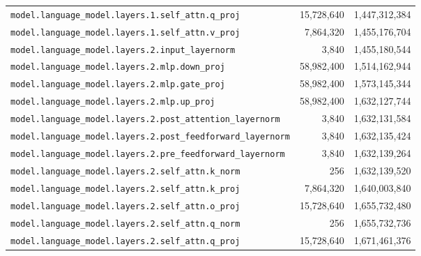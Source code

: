 \documentclass[10pt,a4paper]{article}
\theoremstyle{definition}
\begin{document}
\begin{appendices}
\begin{longtable}{p{9.5cm}rr}
\texttt{model.\allowbreak{}language\_model.\allowbreak{}layers.\allowbreak{}1.\allowbreak{}self\_attn.\allowbreak{}q\_proj} & 15,728,640 & 1,447,312,384 \\
\texttt{model.\allowbreak{}language\_model.\allowbreak{}layers.\allowbreak{}1.\allowbreak{}self\_attn.\allowbreak{}v\_proj} & 7,864,320 & 1,455,176,704 \\
\texttt{model.\allowbreak{}language\_model.\allowbreak{}layers.\allowbreak{}2.\allowbreak{}input\_layernorm} & 3,840 & 1,455,180,544 \\
\texttt{model.\allowbreak{}language\_model.\allowbreak{}layers.\allowbreak{}2.\allowbreak{}mlp.\allowbreak{}down\_proj} & 58,982,400 & 1,514,162,944 \\
\texttt{model.\allowbreak{}language\_model.\allowbreak{}layers.\allowbreak{}2.\allowbreak{}mlp.\allowbreak{}gate\_proj} & 58,982,400 & 1,573,145,344 \\
\texttt{model.\allowbreak{}language\_model.\allowbreak{}layers.\allowbreak{}2.\allowbreak{}mlp.\allowbreak{}up\_proj} & 58,982,400 & 1,632,127,744 \\
\texttt{model.\allowbreak{}language\_model.\allowbreak{}layers.\allowbreak{}2.\allowbreak{}post\_attention\_layernorm} & 3,840 & 1,632,131,584 \\
\texttt{model.\allowbreak{}language\_model.\allowbreak{}layers.\allowbreak{}2.\allowbreak{}post\_feedforward\_layernorm} & 3,840 & 1,632,135,424 \\
\texttt{model.\allowbreak{}language\_model.\allowbreak{}layers.\allowbreak{}2.\allowbreak{}pre\_feedforward\_layernorm} & 3,840 & 1,632,139,264 \\
\texttt{model.\allowbreak{}language\_model.\allowbreak{}layers.\allowbreak{}2.\allowbreak{}self\_attn.\allowbreak{}k\_norm} & 256 & 1,632,139,520 \\
\texttt{model.\allowbreak{}language\_model.\allowbreak{}layers.\allowbreak{}2.\allowbreak{}self\_attn.\allowbreak{}k\_proj} & 7,864,320 & 1,640,003,840 \\
\texttt{model.\allowbreak{}language\_model.\allowbreak{}layers.\allowbreak{}2.\allowbreak{}self\_attn.\allowbreak{}o\_proj} & 15,728,640 & 1,655,732,480 \\
\texttt{model.\allowbreak{}language\_model.\allowbreak{}layers.\allowbreak{}2.\allowbreak{}self\_attn.\allowbreak{}q\_norm} & 256 & 1,655,732,736 \\
\texttt{model.\allowbreak{}language\_model.\allowbreak{}layers.\allowbreak{}2.\allowbreak{}self\_attn.\allowbreak{}q\_proj} & 15,728,640 & 1,671,461,376 \\

\end{longtable}
\end{appendices}
\end{document}
